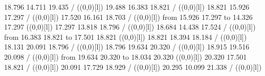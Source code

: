 {{\color[rgb]{0,0,0} 18.796 14.711 19.435 /
}%
%
%
\linethickness=1pt
\setplotsymbol ({\makebox(0,0)[l]{\tencirc{}}})
{\color[rgb]{0,0,0} 19.488 16.383 18.821 /
}%
%
%
\linethickness=1pt
\setplotsymbol ({\makebox(0,0)[l]{\tencirc{}}})
{\color[rgb]{0,0,0} 18.821 15.926 17.297 /
}%
%
%
\linethickness=1pt
\setplotsymbol ({\makebox(0,0)[l]{\tencirc{}}})
{\color[rgb]{0,0,0} 17.520 16.161 18.703 /
}%
%
%
\linethickness=1pt
\setplotsymbol ({\makebox(0,0)[l]{\tencirc{}}})
{\color[rgb]{0,0,0}\putrule from 15.926 17.297 to 14.326 17.297
}%
%
%
\linethickness=1pt
\setplotsymbol ({\makebox(0,0)[l]{\tencirc{}}})
{\color[rgb]{0,0,0} 17.297 13.818 18.796 /
}%
%
%
\linethickness=1pt
\setplotsymbol ({\makebox(0,0)[l]{\tencirc{}}})
{\color[rgb]{0,0,0} 18.684 14.438 17.524 /
}%
%
%
\linethickness=1pt
\setplotsymbol ({\makebox(0,0)[l]{\tencirc{}}})
{\color[rgb]{0,0,0}\putrule from 16.383 18.821 to 17.501 18.821
}%
%
%
\linethickness=1pt
\setplotsymbol ({\makebox(0,0)[l]{\tencirc{}}})
{\color[rgb]{0,0,0} 18.821 18.394 18.184 /
}%
%
%
\linethickness=1pt
\setplotsymbol ({\makebox(0,0)[l]{\tencirc{}}})
{\color[rgb]{0,0,0} 18.131 20.091 18.796 /
}%
%
%
\linethickness=1pt
\setplotsymbol ({\makebox(0,0)[l]{\tencirc{}}})
{\color[rgb]{0,0,0} 18.796 19.634 20.320 /
}%
%
%
\linethickness=1pt
\setplotsymbol ({\makebox(0,0)[l]{\tencirc{}}})
{\color[rgb]{0,0,0} 18.915 19.516 20.098 /
}%
%
%
\linethickness=1pt
\setplotsymbol ({\makebox(0,0)[l]{\tencirc{}}})
{\color[rgb]{0,0,0}\putrule from 19.634 20.320 to 18.034 20.320
}%
%
%
\linethickness=1pt
\setplotsymbol ({\makebox(0,0)[l]{\tencirc{}}})
{\color[rgb]{0,0,0} 20.320 17.501 18.821 /
}%
%
%
\linethickness=1pt
\setplotsymbol ({\makebox(0,0)[l]{\tencirc{}}})
{\color[rgb]{0,0,0} 20.091 17.729 18.929 /
}%
%
%
\linethickness=1pt
\setplotsymbol ({\makebox(0,0)[l]{\tencirc{}}})
{\color[rgb]{0,0,0} 20.295 10.099 21.338 /
}%
%
%
\linethickness=1pt
\setplotsymbol ({\makebox(0,0)[l]{\tencirc{}}})
}
